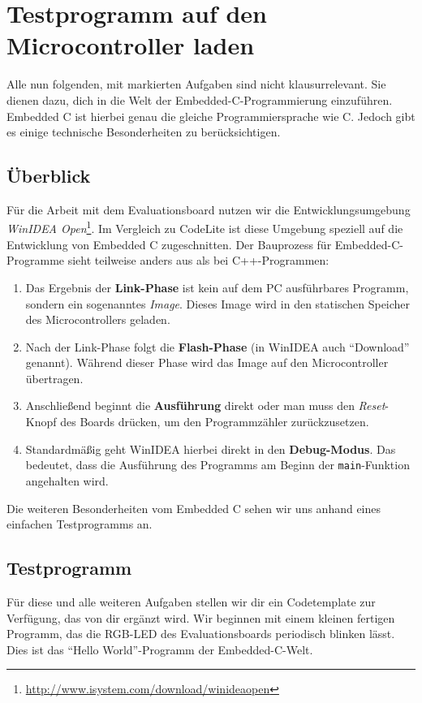 \section{\ExercisePrefixEmbeddedC Testprogramm auf den Microcontroller laden \optional}

\optionaltextbox

Alle nun folgenden, mit \ExercisePrefixEmbeddedC markierten Aufgaben sind nicht klausurrelevant.
Sie dienen dazu, dich in die Welt der Embedded-C-Programmierung einzuführen.
Embedded C ist hierbei genau die gleiche Programmiersprache wie C.
Jedoch gibt es einige technische Besonderheiten zu berücksichtigen.

\subsection{Überblick}
Für die Arbeit mit dem Evaluationsboard nutzen wir die Entwicklungsumgebung \emph{WinIDEA Open}\footnote{\url{http://www.isystem.com/download/winideaopen}}.
%
Im Vergleich zu CodeLite ist diese Umgebung speziell auf die Entwicklung von Embedded C zugeschnitten.
Der Bauprozess für Embedded-C-Programme sieht teilweise anders aus als bei C++-Programmen:
\begin{enumerate}
\item 
Das Ergebnis der \textbf{Link-Phase} ist kein auf dem PC ausführbares Programm, sondern ein sogenanntes \emph{Image}.
Dieses Image wird in den statischen Speicher des Microcontrollers geladen.
\item
Nach der Link-Phase folgt die \textbf{Flash-Phase} (in WinIDEA auch \enquote{Download} genannt).
Während dieser Phase wird das Image auf den Microcontroller übertragen.
\item 
Anschließend beginnt die \textbf{Ausführung} direkt oder man muss den \emph{Reset}-Knopf des Boards drücken, um den Programmzähler zurückzusetzen.
\item
Standardmäßig geht WinIDEA hierbei direkt in den \textbf{Debug-Modus}.
Das bedeutet, dass die Ausführung des Programms am Beginn der \lstinline|main|-Funktion angehalten wird.
\end{enumerate}

Die weiteren Besonderheiten vom Embedded C sehen wir uns anhand eines einfachen Testprogramms an.

\subsection{Testprogramm}
Für diese und alle weiteren Aufgaben stellen wir dir ein Codetemplate zur Verfügung, das von dir ergänzt wird.
Wir beginnen mit einem kleinen fertigen Programm, das die RGB-LED des Evaluationsboards periodisch blinken lässt.
Dies ist das \enquote{Hello World}-Programm der Embedded-C-Welt.

